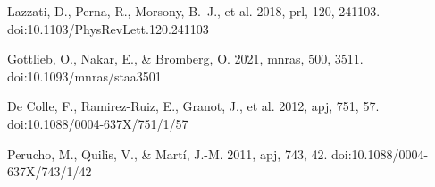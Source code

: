 \documentclass[12pt,a4paper]{book}
\begin{document}
\begin{thebibliography}{20}
 Lazzati, D., Perna, R., Morsony, B.~J., et al. 2018, prl, 120, 241103. doi:10.1103/PhysRevLett.120.241103

 Gottlieb, O., Nakar, E., \& Bromberg, O. 2021, mnras, 500, 3511. doi:10.1093/mnras/staa3501

 De Colle, F., Ramirez-Ruiz, E., Granot, J., et al. 2012, apj, 751, 57. doi:10.1088/0004-637X/751/1/57

 Perucho, M., Quilis, V., \& Martí, J.-M. 2011, apj, 743, 42. doi:10.1088/0004-637X/743/1/42








\end{thebibliography}
\end{document}
